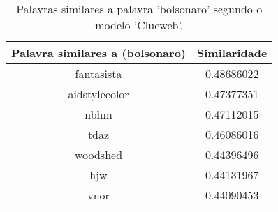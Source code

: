 \begin{table}[H]
\centering
\begin{tabular}{|c | c|}
 \hline
 Palavra similares a (bolsonaro) & Similaridade \\ [0.5ex]
 \hline
 fantasista & 0.48686022 \\
 \hline
 aidstylecolor & 0.47377351 \\
 \hline
 nbhm & 0.47112015 \\
 \hline
 tdaz & 0.46086016 \\
 \hline
 woodshed & 0.44396496 \\
 \hline
 hjw & 0.44131967 \\
 \hline
 vnor & 0.44090453 \\
 \hline
\end{tabular}
\caption{Palavras similares a palavra 'bolsonaro' segundo o modelo 'Clueweb'.}
\label{table:1}
\end{table}

